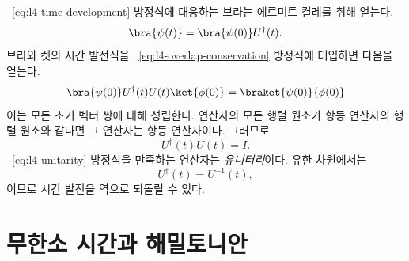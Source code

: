 ~\eqref{eq:l4-time-development} 방정식에 대응하는 브라는 에르미트 켤레를 취해 얻는다. \begin{equation}
\bra{\psi(t)}=\bra{\psi(0)}U^\dagger(t).
\end{equation}브라와 켓의 시간 발전식을 ~\eqref{eq:l4-overlap-conservation} 방정식에 대입하면 다음을 얻는다. \begin{equation}
\bra{\psi(0)}U^\dagger(t)U(t)\ket{\phi(0)}
=
\braket{\psi(0)}{\phi(0)}
\end{equation}이는 모든 초기 벡터 쌍에 대해 성립한다. 연산자의 모든 행렬 원소가 항등 연산자의 행렬 원소와 같다면 그 연산자는 항등 연산자이다. 그러므로 \begin{equation}
U^\dagger(t)U(t)=I.
\label{eq:l4-unitarity}
\end{equation}~\eqref{eq:l4-unitarity} 방정식을 만족하는 연산자는 \emph{유니터리}이다. 유한 차원에서는 \begin{equation}
U^\dagger(t)=U^{-1}(t),
\end{equation}이므로 시간 발전을 역으로 되돌릴 수 있다.

\begin{classroomqa}\end{classroomqa}

\begin{classroomqa}\end{classroomqa}

\section{무한소 시간과 해밀토니안}

